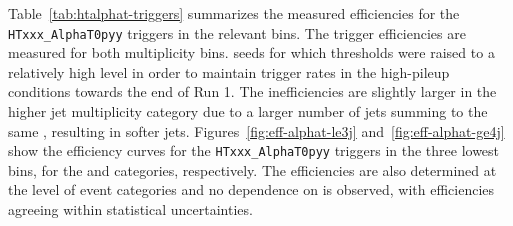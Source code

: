 Table~\ref{tab:htalphat-triggers} summarizes the measured efficiencies
for the \verb!HTxxx_AlphaT0pyy! triggers in the relevant \scalht
bins. The trigger efficiencies are measured for both \njet
multiplicity bins. %
seeds for which thresholds were raised to a relatively high level in
order to maintain trigger rates in the high-pileup conditions towards
the end of Run 1. The inefficiencies are slightly larger in the higher
jet multiplicity category due to a larger number of jets summing to
the same \scalht, resulting in softer
jets. Figures~\ref{fig:eff-alphat-le3j} and~\ref{fig:eff-alphat-ge4j}
show the efficiency curves for the \verb!HTxxx_AlphaT0pyy! triggers in
the three lowest \scalht bins, for the \njetlow and \njethigh
categories, respectively. The efficiencies are also determined at the
level of event categories and no dependence on \nb is observed, with
efficiencies agreeing within statistical uncertainties.


